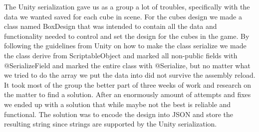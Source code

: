 The Unity serialization gave us as a group a lot of troubles, specifically with the data we wanted saved for each cube in scene.
For the cubes design we made a class named BoxDesign that was intended to contain all the data and functionality needed to 
control and set the design for the cubes in the game.
By following the guidelines from Unity on how to make the class serialize we made the class derive from ScriptableObject
and marked all non-public fields with @SerializeField and marked the entire class with @Serialize, but no matter what
 we tried to do the array we put the data into did not survive the assembly reload.
 It took most of the group the better part of three weeks of work and research on the matter to find a solution.
 After an enormously amount of attempts and fixes we ended up with a solution that while maybe not the best is reliable
  and functional. The solution was to encode the design into JSON and store the resulting string since strings are
   supported by the Unity serialization.